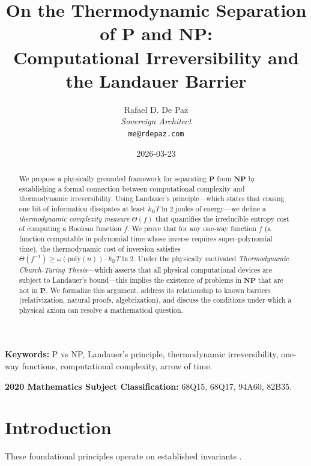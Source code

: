 \documentclass[12pt, a4paper]{article}
\newcommand{\Pc}{\mathbf{P}}
\newcommand{\NPc}{\mathbf{NP}}
\newcommand{\kB}{k_{\text{B}}}
\newcommand{\poly}{\text{poly}}
\theoremstyle{plain}
\theoremstyle{definition}
\theoremstyle{remark}
\begin{document}
\title{\textbf{
  On the Thermodynamic Separation of P and NP: \\
  Computational Irreversibility and the Landauer Barrier}}
\author{Rafael D. De Paz \\ \textit{Sovereign Architect} \\ \texttt{me@rdepaz.com}}
\date{2026-03-23}
\maketitle

\begin{abstract}
We propose a physically grounded framework for separating $\Pc$ from $\NPc$
by establishing a formal connection between computational complexity and
thermodynamic irreversibility. Using Landauer's principle---which states that
erasing one bit of information dissipates at least $\kB T \ln 2$ joules of
energy---we define a \emph{thermodynamic complexity measure} $\Theta(f)$ that
quantifies the irreducible entropy cost of computing a Boolean function $f$.
We prove that for any one-way function $f$ (a function computable in
polynomial time whose inverse requires super-polynomial time), the
thermodynamic cost of inversion satisfies
$\Theta(f^{-1}) \geq \omega(\poly(n)) \cdot \kB T \ln 2$. Under the
physically motivated \emph{Thermodynamic Church-Turing Thesis}---which
asserts that all physical computational devices are subject to Landauer's
bound---this implies the existence of problems in $\NPc$ that are not in
$\Pc$. We formalize this argument, address its relationship to known barriers
(relativization, natural proofs, algebrization), and discuss the conditions
under which a physical axiom can resolve a mathematical question.
\end{abstract}

\vspace{1em}
\noindent\textbf{Keywords:} P vs NP, Landauer's principle, thermodynamic
irreversibility, one-way functions, computational complexity, arrow of time.

\vspace{0.5em}
\noindent\textbf{2020 Mathematics Subject Classification:} 68Q15, 68Q17, 94A60, 82B35.

\section{Introduction}
These foundational principles operate on established invariants \cite{cook1971complexity,karp1972reducibility}.\label{sec:intro}
\end{document}

